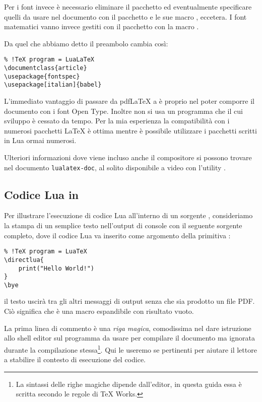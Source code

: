 Per i font invece è necessario eliminare il pacchetto  ed
eventualmente specificare quelli da usare nel documento con il pacchetto
 e le sue macro ,  eccetera. I
font matematici vanno invece gestiti con il pacchetto  con la
macro .

Da quel che abbiamo detto il preambolo cambia così:
\begin{Verbatim}
% !TeX program = LuaLaTeX
\documentclass{article}
\usepackage{fontspec}
\usepackage[italian]{babel}
\end{Verbatim}

L'immediato vantaggio di passare da pdf\LaTeX{} a \LuaLaTeX{} è proprio nel
poter comporre il documento con i font Open Type. Inoltre non si usa un
programma che il cui sviluppo è cessato da tempo. Per la mia esperienza la
compatibilità con i numerosi pacchetti \LaTeX{} è ottima mentre è possibile
utilizzare i pacchetti scritti in Lua ormai numerosi.

Ulteriori informazioni dove viene incluso anche il compositore \XeLaTeX{} si
possono trovare nel documento \texttt{lualatex-doc}, al solito disponibile a
video con l'utility .

\subsection{Codice Lua in \LuaTeX}

Per illustrare l'esecuzione di codice Lua all'interno di un sorgente \LuaTeX,
consideriamo la stampa di un semplice testo nell'output di console con il
seguente sorgente completo, dove il codice Lua va inserito come argomento della
primitiva :
\begin{Verbatim}
% !TeX program = LuaTeX
\directlua{
    print("Hello World!")
}
\bye
\end{Verbatim}
il testo uscirà tra gli altri messaggi di output senza che sia prodotto un file
PDF. Ciò significa che  è una macro espandibile con risultato
vuoto.

La prima linea di commento è una \emph{riga magica}, comodissima nel dare
istruzione allo shell editor sul programma da usare per compilare il documento
ma ignorata durante la compilazione stessa\footnote{La sintassi delle righe
magiche dipende dall'editor, in questa guida essa è scritta secondo le regole
di TeX Works.}. Qui le useremo se pertinenti per aiutare il lettore a
stabilire il contesto di esecuzione del codice.

